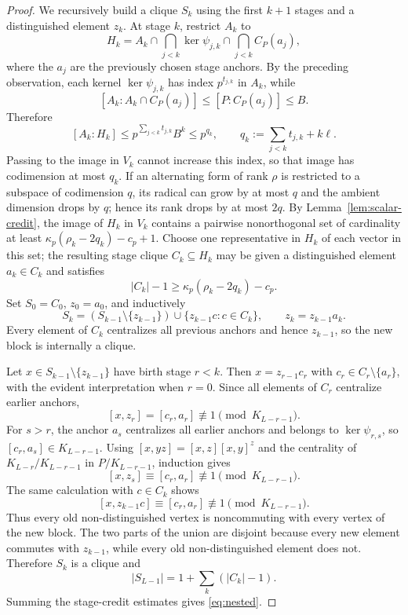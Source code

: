 \documentclass[11pt]{article}
\theoremstyle{definition}
\theoremstyle{remark}
\begin{document}
\begin{proof}
We recursively build a clique $S_k$ using the first $k+1$ stages and a distinguished element $z_k$. At stage $k$, restrict $A_k$ to
\[
H_k=A_k\cap\bigcap_{j<k}\ker\psi_{j,k}\cap\bigcap_{j<k}C_P(a_j),
\]
where the $a_j$ are the previously chosen stage anchors. By the preceding observation, each kernel $\ker\psi_{j,k}$ has index $p^{t_{j,k}}$ in $A_k$, while
\[
[A_k:A_k\cap C_P(a_j)]\le[P:C_P(a_j)]\le B.
\]
Therefore
\[
[A_k:H_k]\le p^{\sum_{j<k}t_{j,k}}B^k\le p^{q_k},\qquad q_k:=\sum_{j<k}t_{j,k}+k\ell.
\]
Passing to the image in $V_k$ cannot increase this index, so that image has codimension at most $q_k$. If an alternating form of rank $\rho$ is restricted to a subspace of codimension $q$, its radical can grow by at most $q$ and the ambient dimension drops by $q$; hence its rank drops by at most $2q$. By Lemma~\ref{lem:scalar-credit}, the image of $H_k$ in $V_k$ contains a pairwise nonorthogonal set of cardinality at least $\kappa_p(\rho_k-2q_k)-c_p+1$. Choose one representative in $H_k$ of each vector in this set; the resulting stage clique $C_k\subseteq H_k$ may be given a distinguished element $a_k\in C_k$ and satisfies
\[
|C_k|-1\ge\kappa_p(\rho_k-2q_k)-c_p.
\]
Set $S_0=C_0$, $z_0=a_0$, and inductively
\[
S_k=(S_{k-1}\setminus\{z_{k-1}\})\cup\{z_{k-1}c:c\in C_k\},\qquad z_k=z_{k-1}a_k.
\]
Every element of $C_k$ centralizes all previous anchors and hence $z_{k-1}$, so the new block is internally a clique.

Let $x\in S_{k-1}\setminus\{z_{k-1}\}$ have birth stage $r<k$. Then $x=z_{r-1}c_r$ with $c_r\in C_r\setminus\{a_r\}$, with the evident interpretation when $r=0$. Since all elements of $C_r$ centralize earlier anchors,
\[
[x,z_r]=[c_r,a_r]\not\equiv1\pmod{K_{L-r-1}}.
\]
For $s>r$, the anchor $a_s$ centralizes all earlier anchors and belongs to $\ker\psi_{r,s}$, so $[c_r,a_s]\in K_{L-r-1}$. Using $[x,yz]=[x,z][x,y]^z$ and the centrality of $K_{L-r}/K_{L-r-1}$ in $P/K_{L-r-1}$, induction gives
\[
[x,z_s]\equiv[c_r,a_r]\not\equiv1\pmod{K_{L-r-1}}.
\]
The same calculation with $c\in C_k$ shows
\[
[x,z_{k-1}c]\equiv[c_r,a_r]\not\equiv1\pmod{K_{L-r-1}}.
\]
Thus every old non-distinguished vertex is noncommuting with every vertex of the new block. The two parts of the union are disjoint because every new element commutes with $z_{k-1}$, while every old non-distinguished element does not. Therefore $S_k$ is a clique and
\[
|S_{L-1}|=1+\sum_k(|C_k|-1).
\]
Summing the stage-credit estimates gives \eqref{eq:nested}.
\end{proof}
\end{document}
